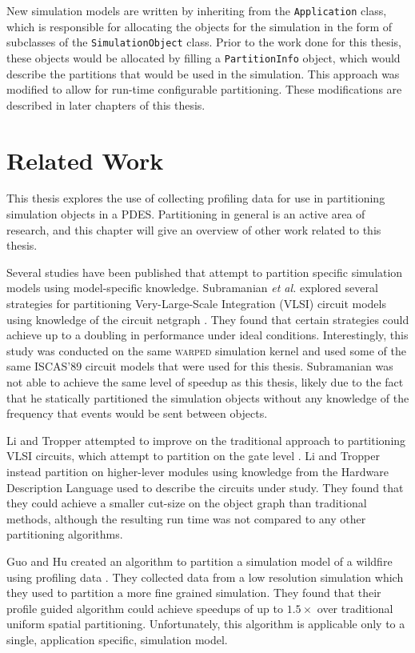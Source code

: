 \documentclass[11pt]{book}
\begin{document}
New simulation models are written by inheriting from the \texttt{Application} class, which is responsible for allocating the objects for the simulation in the form of subclasses of the \texttt{SimulationObject} class. Prior to the work done for this thesis, these objects would be allocated by filling a \texttt{PartitionInfo} object, which would describe the partitions that would be used in the simulation. This approach was modified to allow for run-time configurable partitioning. These modifications are described in later chapters of this thesis.

\chapter{Related Work}\label{relatedWork}

This thesis explores the use of collecting profiling data for use in partitioning simulation objects in a PDES. Partitioning in general is an active area of research, and this chapter will give an overview of other work related to this thesis.

Several studies have been published that attempt to partition specific simulation models using model-specific knowledge. Subramanian \emph{et al.} explored several strategies for partitioning Very-Large-Scale Integration (VLSI) circuit models using knowledge of the circuit netgraph \cite{subramanian-01}. They found that certain strategies could achieve up to a doubling in performance under ideal conditions. Interestingly, this study was conducted on the same \textsc{warped} simulation kernel and used some of the same ISCAS'89 circuit models that were used for this thesis. Subramanian was not able to achieve the same level of speedup as this thesis, likely due to the fact that he statically partitioned the simulation objects without any knowledge of the frequency that events would be sent between objects.

Li and Tropper attempted to improve on the traditional approach to partitioning VLSI circuits, which attempt to partition on the gate level \cite{lijun-09}. Li and Tropper instead partition on higher-lever modules using knowledge from the Hardware Description Language used to describe the circuits under study. They found that they could achieve a smaller cut-size on the object graph than traditional methods, although the resulting run time was not compared to any other partitioning algorithms.

Guo and Hu created an algorithm to partition a simulation model of a wildfire using profiling data \cite{guo-11}. They collected data from a low resolution simulation which they used to partition a more fine grained simulation. They found that their profile guided algorithm could achieve speedups of up to \(1.5\times\) over traditional uniform spatial partitioning. Unfortunately, this algorithm is applicable only to a single, application specific, simulation model.
\end{document}

